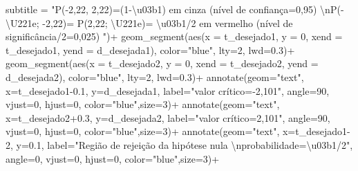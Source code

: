 \documentclass[
]{book}
\newenvironment{Shaded}{\begin{snugshade}}{\end{snugshade}}
\newcommand{\AttributeTok}[1]{\textcolor[rgb]{0.77,0.63,0.00}{#1}}
\newcommand{\DecValTok}[1]{\textcolor[rgb]{0.00,0.00,0.81}{#1}}
\newcommand{\FloatTok}[1]{\textcolor[rgb]{0.00,0.00,0.81}{#1}}
\newcommand{\FunctionTok}[1]{\textcolor[rgb]{0.00,0.00,0.00}{#1}}
\newcommand{\NormalTok}[1]{#1}
\newcommand{\SpecialCharTok}[1]{\textcolor[rgb]{0.00,0.00,0.00}{#1}}
\newcommand{\StringTok}[1]{\textcolor[rgb]{0.31,0.60,0.02}{#1}}
\begin{document}
\begin{Shaded}
\begin{Highlighting}[]
       \AttributeTok{subtitle =} \StringTok{"P({-}2,22, 2,22)=(1{-}\textbackslash{}u03b1) em cinza (nível de confiança=0,95) }\SpecialCharTok{\textbackslash{}n}\StringTok{P({-}\textbackslash{}U221e; {-}2,22)= P(2,22; \textbackslash{}U221e)= \textbackslash{}u03b1/2 em vermelho (nível de significância/2=0,025) "}\NormalTok{)}\SpecialCharTok{+} \FunctionTok{geom\_segment}\NormalTok{(}\FunctionTok{aes}\NormalTok{(}\AttributeTok{x =}\NormalTok{ t\_desejado1, }\AttributeTok{y =} \DecValTok{0}\NormalTok{, }\AttributeTok{xend =}\NormalTok{ t\_desejado1, }\AttributeTok{yend =}\NormalTok{ d\_desejada1), }\AttributeTok{color=}\StringTok{"blue"}\NormalTok{, }\AttributeTok{lty=}\DecValTok{2}\NormalTok{, }\AttributeTok{lwd=}\FloatTok{0.3}\NormalTok{)}\SpecialCharTok{+}
 \FunctionTok{geom\_segment}\NormalTok{(}\FunctionTok{aes}\NormalTok{(}\AttributeTok{x =}\NormalTok{ t\_desejado2, }\AttributeTok{y =} \DecValTok{0}\NormalTok{, }\AttributeTok{xend =}\NormalTok{ t\_desejado2, }\AttributeTok{yend =}\NormalTok{ d\_desejada2), }\AttributeTok{color=}\StringTok{"blue"}\NormalTok{, }\AttributeTok{lty=}\DecValTok{2}\NormalTok{, }\AttributeTok{lwd=}\FloatTok{0.3}\NormalTok{)}\SpecialCharTok{+}
  \FunctionTok{annotate}\NormalTok{(}\AttributeTok{geom=}\StringTok{"text"}\NormalTok{, }\AttributeTok{x=}\NormalTok{t\_desejado1}\FloatTok{{-}0.1}\NormalTok{, }\AttributeTok{y=}\NormalTok{d\_desejada1, }\AttributeTok{label=}\StringTok{"valor crítico={-}2,101"}\NormalTok{, }\AttributeTok{angle=}\DecValTok{90}\NormalTok{, }\AttributeTok{vjust=}\DecValTok{0}\NormalTok{, }\AttributeTok{hjust=}\DecValTok{0}\NormalTok{, }\AttributeTok{color=}\StringTok{"blue"}\NormalTok{,}\AttributeTok{size=}\DecValTok{3}\NormalTok{)}\SpecialCharTok{+}
  \FunctionTok{annotate}\NormalTok{(}\AttributeTok{geom=}\StringTok{"text"}\NormalTok{, }\AttributeTok{x=}\NormalTok{t\_desejado2}\FloatTok{+0.3}\NormalTok{, }\AttributeTok{y=}\NormalTok{d\_desejada2, }\AttributeTok{label=}\StringTok{"valor crítico=2,101"}\NormalTok{, }\AttributeTok{angle=}\DecValTok{90}\NormalTok{, }\AttributeTok{vjust=}\DecValTok{0}\NormalTok{, }\AttributeTok{hjust=}\DecValTok{0}\NormalTok{, }\AttributeTok{color=}\StringTok{"blue"}\NormalTok{,}\AttributeTok{size=}\DecValTok{3}\NormalTok{)}\SpecialCharTok{+}
 \FunctionTok{annotate}\NormalTok{(}\AttributeTok{geom=}\StringTok{"text"}\NormalTok{, }\AttributeTok{x=}\NormalTok{t\_desejado1}\DecValTok{{-}2}\NormalTok{, }\AttributeTok{y=}\FloatTok{0.1}\NormalTok{, }\AttributeTok{label=}\StringTok{"Região de rejeição da hipótese nula }\SpecialCharTok{\textbackslash{}n}\StringTok{probabilidade=\textbackslash{}u03b1/2"}\NormalTok{, }\AttributeTok{angle=}\DecValTok{0}\NormalTok{, }\AttributeTok{vjust=}\DecValTok{0}\NormalTok{, }\AttributeTok{hjust=}\DecValTok{0}\NormalTok{, }\AttributeTok{color=}\StringTok{"blue"}\NormalTok{,}\AttributeTok{size=}\DecValTok{3}\NormalTok{)}\SpecialCharTok{+}

\end{Highlighting}
\end{Shaded}
\end{document}
